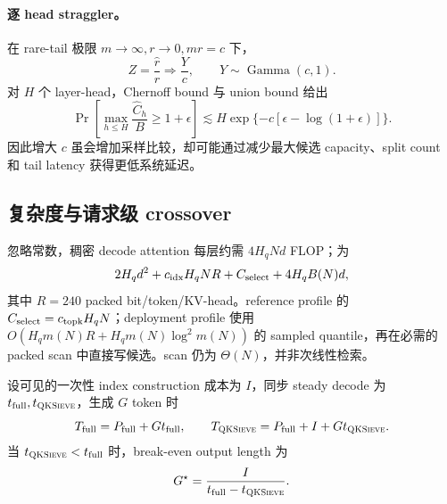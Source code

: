 \paragraph{逐 head straggler。}
在 rare-tail 极限 $m\to\infty,r\to0,mr=c$ 下，
\begin{equation}
 Z=\frac{\widehat r}{r}\Longrightarrow\frac{Y}{c},
 \qquad Y\sim\operatorname{Gamma}(c,1).
 \label{eq:quantile-gamma-limit}
\end{equation}
对 $H$ 个 layer-head，Chernoff bound 与 union bound 给出
\begin{equation}
 \Pr\left[\max_{h\le H}\frac{\widehat C_h}{B}\ge1+\epsilon\right]
 \lesssim
 H\exp\{-c[\epsilon-\log(1+\epsilon)]\}.
 \label{eq:quantile-headwise-straggler}
\end{equation}
因此增大 $c$ 虽会增加采样比较，却可能通过减少最大候选 capacity、split
count 和 tail latency 获得更低系统延迟。

\subsection{复杂度与请求级 crossover}

忽略常数，稠密 decode attention 每层约需 $4H_qNd$ FLOP；\method 为
\begin{equation}
 2H_qd^2+c_{\rm idx}H_qNR+C_{\rm select}
 +4H_qB(N)d,
 \label{eq:cost}
\end{equation}
其中 $R=240$ packed bit/token/KV-head。reference profile 的
$C_{\rm select}=c_{\rm topk}H_qN$；deployment profile 使用
$O(H_qm(N)R+H_qm(N)\log^2m(N))$ 的 sampled quantile，再在必需的 packed
scan 中直接写候选。scan 仍为 $\Theta(N)$，并非次线性检索。

设可见的一次性 index construction 成本为 $I$，同步 steady decode 为
$t_{\rm full},t_{\textsc{QKSieve}}$，生成 $G$ token 时
\begin{equation}
 T_{\rm full}=P_{\rm full}+Gt_{\rm full},\qquad
 T_{\textsc{QKSieve}}=P_{\rm full}+I+Gt_{\textsc{QKSieve}}.
 \label{eq:request-cost}
\end{equation}
当 $t_{\textsc{QKSieve}}<t_{\rm full}$ 时，break-even output length 为
\begin{equation}
 G^\star=\frac{I}{t_{\rm full}-t_{\textsc{QKSieve}}}.
 \label{eq:break-even}
\end{equation}

